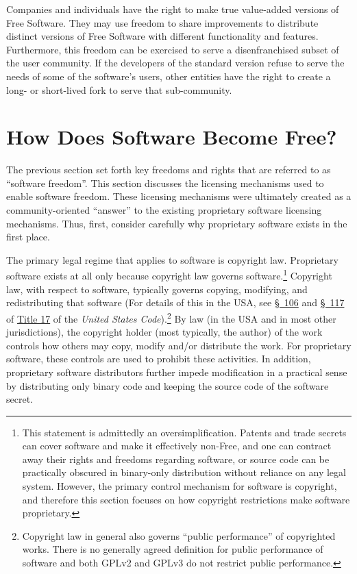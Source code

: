 Companies and individuals have the right to make true value-added versions
of Free Software.  They may use freedom to share improvements to
distribute distinct versions of Free Software with different functionality
and features.  Furthermore, this freedom can be exercised to serve a
disenfranchised subset of the user community.  If the developers of the
standard version refuse to serve the needs of some of the software's
users, other entities have the right to create a long- or short-lived fork
to serve that sub-community.

\section{How Does Software Become Free?}

The previous section set forth key freedoms and rights that are referred to
as ``software freedom''.  This section discusses the licensing mechanisms
used to enable software freedom.  These licensing mechanisms were ultimately
created as a community-oriented ``answer'' to the existing proprietary
software licensing mechanisms.  Thus, first, consider carefully why
proprietary software exists in the first place.

\label{explaining-copyright}

The primary legal regime that applies to software is copyright law.
Proprietary software exists at all only because copyright law governs
software.\footnote{This statement is admittedly an oversimplification. Patents and
  trade secrets can cover software and make it effectively non-Free, and one
  can contract away their rights and freedoms regarding software, or source
  code can be practically obscured in binary-only distribution without
  reliance on any legal system.  However, the primary control mechanism for
  software is copyright, and therefore this section focuses on how copyright
  restrictions make software proprietary.} Copyright law, with respect to
software, typically governs copying, modifying, and redistributing that
software (For details of this in the USA, see
\href{http://www.copyright.gov/title17/92chap1.html#106}{\S~106} and
\href{http://www.copyright.gov/title17/92chap1.html#117}{\S~117} of
\href{http://www.law.cornell.edu/uscode/text/17}{Title 17} of the
\textit{United States Code}).\footnote{Copyright law in general also governs
  ``public performance'' of copyrighted works. There is no generally agreed
  definition for public performance of software and both GPLv2 and GPLv3 do
  not restrict public performance.} By law (in the USA and in most other
jurisdictions), the copyright holder (most typically, the author) of the work controls
how others may copy, modify and/or distribute the work. For proprietary
software, these controls are used to prohibit these activities. In addition,
proprietary software distributors further impede modification in a practical
sense by distributing only binary code and keeping the source code of the
software secret.

